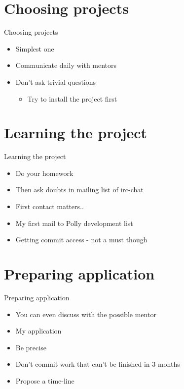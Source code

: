 \documentclass{beamer}
\begin{document}
\section{Choosing projects}
\begin{frame}{Choosing projects}
\begin{itemize}
\begin{block}
{Starting to contribute to a project earlier is the natural way to enter GSOC.
In that sense this is a long term commitment}
\end{block}
\item Simplest one
\item Communicate daily with mentors
\item Don't ask trivial questions
  \begin{itemize}
  \item Try to install the project first
  \end{itemize}
\end{itemize}
\end{frame}

\section{Learning the project}
\begin{frame}{Learning the project}
\begin{itemize}
\item Do your homework
\item Then ask doubts in mailing list of irc-chat
\item First contact matters..
\item My first mail to Polly development list
\item Getting commit access - not a must though
\end{itemize}
\end{frame}

\section{Preparing application}
\begin{frame}{Preparing application}
\begin{itemize}
\item You can even discuss with the possible mentor
\item My application
\item Be precise
\item Don't commit work that can't be finished in 3 months
\item Propose a time-line
\end{itemize}
\end{frame}
\end{document}
